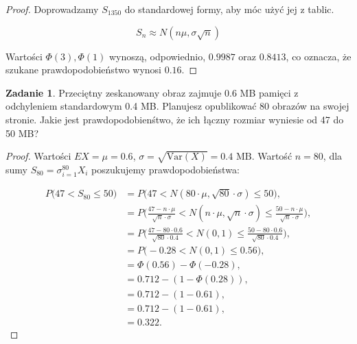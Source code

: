 \documentclass[11pt]{article}
\theoremstyle{definition}
\newtheorem{zadanie}{Zadanie}
\begin{document}
\begin{proof}


    Doprowadzamy $S_{1350}$ do standardowej formy, aby móc użyć jej z tablic.

    $$S_n\approx N(n\mu,\sigma\sqrt{n})$$

    Wartości $\Phi(3), \Phi(1)$ wynoszą, odpowiednio, $0.9987$ oraz $0.8413$, co oznacza, że szukane prawdopodobieństwo wynosi $0.16$.

\end{proof}

\begin{zadanie}
    Przeciętny zeskanowany obraz zajmuje 0.6 MB pamięci z odchyleniem standardowym 0.4 MB. Planujesz opublikować
    80 obrazów na swojej stronie. Jakie jest prawdopodobienśtwo, że ich łączny rozmiar wyniesie od 47 do 50 MB?
\end{zadanie}
\begin{proof}
    Wartości $EX=\mu=0.6$, $\sigma=\sqrt{\text{Var}(X)} = 0.4\text{ MB}$. Wartość $n=80$, dla sumy $S_{80}=\sigma_{i=1}^{80}X_i$ poszukujemy prawdopodobieństwa:

    \begin{align*}
        P\Bigg(47<S_{80}\leq 50\Bigg) & = P\Bigg(47 <N(80\cdot\mu, \sqrt{80}\cdot\sigma)\leq 50\Bigg),                                                                           \\
                                      & = P\Bigg(\frac{47-n\cdot\mu}{\sqrt{n}\cdot\sigma} <N(n\cdot\mu, \sqrt{n}\cdot\sigma)\leq \frac{50-n\cdot\mu}{\sqrt{n}\cdot\sigma}\Bigg), \\
                                      & = P\Bigg(\frac{47-80\cdot0.6}{\sqrt{80}\cdot0.4} <N(0,1)\leq \frac{50-80\cdot0.6}{\sqrt{80}\cdot0.4}\Bigg),                              \\
                                      & = P\Bigg(-0.28<N(0,1)\leq 0.56\Bigg),                                                                                                    \\
                                      & =\Phi(0.56) - \Phi(-0.28),                                                                                                               \\
                                      & = 0.712 - (1-\Phi(0.28)),                                                                                                                \\
                                      & = 0.712 - (1 - 0.61),                                                                                                                    \\
                                      & = 0.712 - (1 - 0.61),                                                                                                                    \\
                                      & = 0.322.
    \end{align*}

\end{proof}
\end{document}
